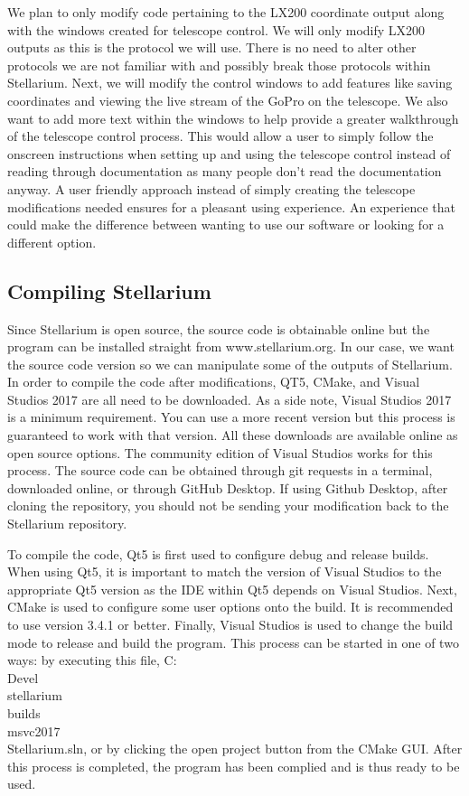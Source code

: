 \documentclass[12pt]{report}
\begin{document}
We plan to only modify code pertaining to the LX200 coordinate output along with the windows created for telescope control. We will only modify LX200 outputs as this is the protocol we will use. There is no need to alter other protocols we are not familiar with and possibly break those protocols within Stellarium. Next, we will modify the control windows to add features like saving coordinates and viewing the live stream of the GoPro on the telescope. We also want to add more text within the windows to help provide a greater walkthrough of the telescope control process. This would allow a user to simply follow the onscreen instructions when setting up and using the telescope control instead of reading through documentation as many people don’t read the documentation anyway. A user friendly approach instead of simply creating the telescope modifications needed ensures for a pleasant using experience. An experience that could make the difference between wanting to use our software or looking for a different option.

\subsection*{Compiling Stellarium}

Since Stellarium is open source, the source code is obtainable online but the program can be installed straight from www.stellarium.org. In our case, we want the source code version so we can manipulate some of the outputs of Stellarium. In order to compile the code after modifications, QT5, CMake, and Visual Studios 2017 are all need to be downloaded. As a side note, Visual Studios 2017 is a minimum requirement. You can use a more recent version but this process is guaranteed to work with that version. All these downloads are available online as open source options. The community edition of Visual Studios works for this process. The source code can be obtained through git requests in a terminal, downloaded online, or through GitHub Desktop. If using Github Desktop, after cloning the repository, you should not be sending your modification back to the Stellarium repository.

To compile the code, Qt5 is first used to configure debug and release builds. When using Qt5, it is important to match the version of Visual Studios to the appropriate Qt5 version as the IDE within Qt5 depends on Visual Studios. Next, CMake is used to configure some user options onto the build. It is recommended to use version 3.4.1 or better. Finally, Visual Studios is used to change the build mode to release and build the program. This process can be started in one of two ways: by executing this file, C:\\Devel\\stellarium\\builds\\msvc2017\\Stellarium.sln, or by clicking the open project button from the CMake GUI. After this process is completed, the program has been complied and is thus ready to be used.
\end{document}

